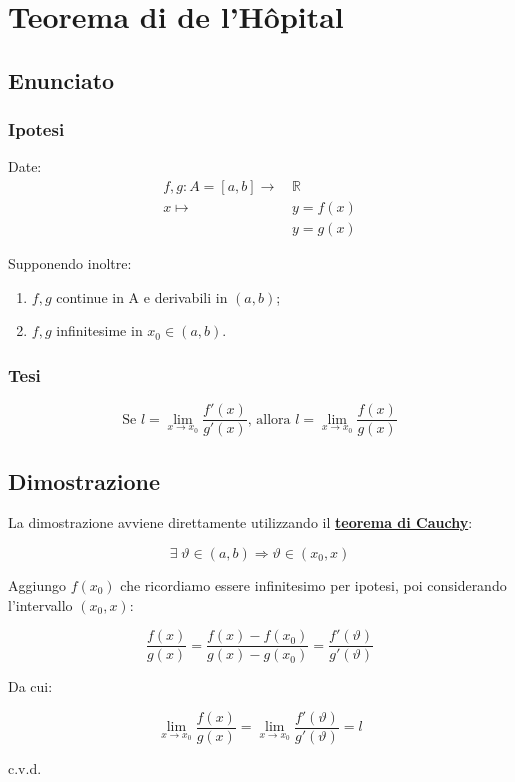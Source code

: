 \documentclass[../../dimostrazioni]{subfiles}
\begin{document}
    \chapter{Teorema di de l'Hôpital}
    \label{teoHopital}

        \section*{Enunciato}

            \subsection*{Ipotesi}

                Date:
                \begin{align*}
                    f,g : A = [a, b] \longrightarrow \, &\mathbb{R}\\
                    x \longmapsto \, &y = f(x)\\
                                  &y = g(x) 
                \end{align*}

                Supponendo inoltre: 

                \begin{enumerate}
                    \indentitem \item \(f, g\) continue in A e derivabili in \( (a,b) \);
                    \indentitem \item \(f, g\) infinitesime in \(x_0 \in (a,b)\).
                \end{enumerate}

            \subsection*{Tesi}

                \[ 
                    \text{Se } l = \lim_{x \to x_0} \frac{f'(x)}{g'(x)} \text{, allora } l = \lim_{x \to x_0} \frac{f(x)}{g(x)}
                \]

        \section*{Dimostrazione}

            La dimostrazione avviene direttamente utilizzando il \textbf{\hyperref[teoCauchy]{teorema di Cauchy}}:

            \[ \exists \; \vartheta \in (a,b) \Rightarrow \vartheta \in (x_0, x) \]

            Aggiungo \(f(x_0)\) che ricordiamo essere infinitesimo per ipotesi, poi considerando l'intervallo \((x_0, x)\):

            \[  \frac{f(x)}{g(x)} = \frac{f(x) - f(x_0)}{g(x) - g(x_0)} = \frac{f'(\vartheta)}{g'(\vartheta)} \]

            Da cui:
            
            \[  \lim_{x \to x_0} \frac{f(x)}{g(x)} = \lim_{x \to x_0} \frac{f'(\vartheta)}{g'(\vartheta)} = l \]
            
            c.v.d.
\end{document}
